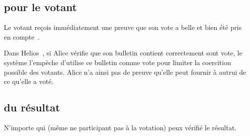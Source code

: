 \documentclass[../report]{subfiles}
\begin{document}
\subsection{pour le votant}
Le votant reçois immédiatement une preuve que son vote a belle et bien été pris en 
compte~\cite{adida_ballot_2006}.

Dans Helios~\cite{noauthor_helios_nodate}, si Alice vérifie que son bulletin contient
correctement sont vote, le système l'empèche d'utilise ce bulletin comme vote pour limiter
la coercition possible des votants.
Alice n'a ainsi pas de preuve qu'elle peut fournir à autrui de ce qu'elle a voté.

\subsection{du résultat}
N'importe qui (même ne participant pas à la votation) peux vérifié le résultat.
\todo{}
\end{document}
